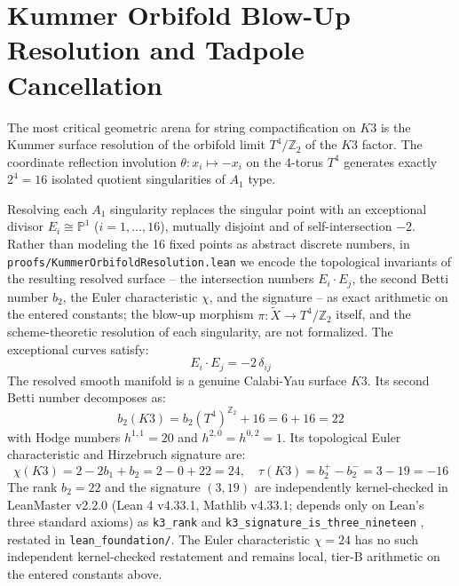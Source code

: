 \documentclass[11pt,a4paper]{article}
\begin{document}
\section{Kummer Orbifold Blow-Up Resolution and Tadpole Cancellation}
The most critical geometric arena for string compactification on $K3$ is the Kummer surface resolution of the orbifold limit $T^4/\mathbb{Z}_2$ of the $K3$ factor. The coordinate reflection involution $\theta: x_i \mapsto -x_i$ on the 4-torus $T^4$ generates exactly $2^4 = 16$ isolated quotient singularities of $A_1$ type.

Resolving each $A_1$ singularity replaces the singular point with an exceptional divisor $E_i \cong \mathbb{P}^1$ ($i = 1, \dots, 16$), mutually disjoint and of self-intersection $-2$. Rather than modeling the 16 fixed points as abstract discrete numbers, in \texttt{proofs/KummerOrbifoldResolution.lean} we encode the topological invariants of the resulting resolved surface -- the intersection numbers $E_i \cdot E_j$, the second Betti number $b_2$, the Euler characteristic $\chi$, and the signature -- as exact arithmetic on the entered constants; the blow-up morphism $\pi: \widetilde{X} \to T^4/\mathbb{Z}_2$ itself, and the scheme-theoretic resolution of each singularity, are not formalized. The exceptional curves satisfy:
\begin{equation}
\label{eq:kummer_intersection}
E_i \cdot E_j = -2 \, \delta_{ij}
\end{equation}
The resolved smooth manifold is a genuine Calabi-Yau surface $K3$. Its second Betti number decomposes as:
\begin{equation}
b_2(K3) = b_2(T^4)^{\mathbb{Z}_2} + 16 = 6 + 16 = 22
\end{equation}
with Hodge numbers $h^{1,1} = 20$ and $h^{2,0} = h^{0,2} = 1$. Its topological Euler characteristic and Hirzebruch signature are:
\begin{equation}
\chi(K3) = 2 - 2 b_1 + b_2 = 2 - 0 + 22 = 24, \quad \tau(K3) = b_2^+ - b_2^- = 3 - 19 = -16
\end{equation}
The rank $b_2 = 22$ and the signature $(3,19)$ are independently kernel-checked in LeanMaster v2.2.0 (Lean 4 v4.33.1, Mathlib v4.33.1; depends only on Lean's three standard axioms) as \texttt{k3\_rank} and \texttt{k3\_signature\_is\_three\_nineteen} \cite{leanmaster2026}, restated in \texttt{lean\_foundation/}. The Euler characteristic $\chi = 24$ has no such independent kernel-checked restatement and remains local, tier-B arithmetic on the entered constants above.
\end{document}

